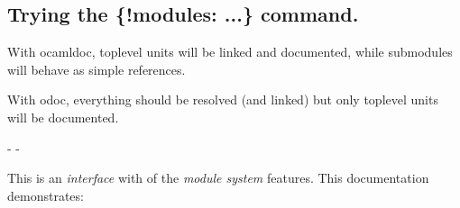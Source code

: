 \\
    \hyperref[Ocamlary-IncludeInclude1]{}\label{Ocamlary-module-type-IncludeInclude2}\begin{ocamlindent}\label{Ocamlary-module-type-IncludeInclude2-type-include_include}\\
\end{ocamlindent}%
\\
\label{Ocamlary-module-IncludeInclude2_M}\begin{ocamlindent}\end{ocamlindent}%
\\
 \hyperref[Ocamlary-module-type-IncludeInclude2]{}\label{Ocamlary-type-include_include}\\
\subsection{Trying the \{!modules: ...\} command.\label{Ocamlary-indexmodules}}%
With ocamldoc, toplevel units will be linked and documented, while submodules will behave as simple references.

With odoc, everything should be resolved (and linked) but only toplevel units will be documented.

\begin{description}\kern-\topsep
\makeatletter\advance\@topsepadd-\topsep\makeatother%
\item[{\hyperref[Ocamlary-Dep1-X]{\ocamlinlinecode{\ocamlinlinecode{Dep1.\allowbreak{}X}}[p\pageref*{Ocamlary-Dep1-X}]}}]{}%
\item[{\hyperref[Ocamlary-IncludeInclude1]{\ocamlinlinecode{\ocamlinlinecode{Ocamlary.\allowbreak{}IncludeInclude1}}[p\pageref*{Ocamlary-IncludeInclude1}]}}]{}%
\item[{\hyperref[Ocamlary]{\ocamlinlinecode{\ocamlinlinecode{Ocamlary}}[p\pageref*{Ocamlary}]}}]{This is an \emph{interface} with  of the \emph{module system} features. This documentation demonstrates:}\end{description}%
